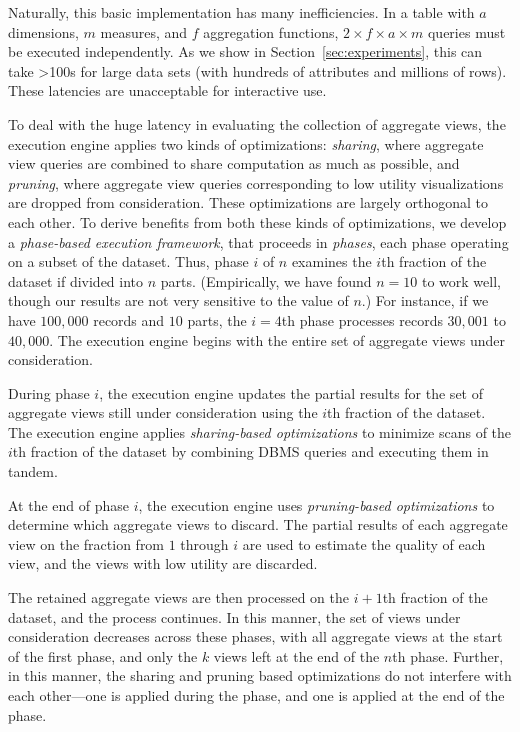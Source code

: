 Naturally, this basic implementation has many inefficiencies.
In a table with $a$ dimensions, $m$ measures, and $f$ aggregation functions, 
$2\times f \times a \times  m$ queries must be executed independently.  
As we show in Section~\ref{sec:experiments}, this can take >100s for
large data sets (with hundreds of attributes and millions of rows).
These latencies are unacceptable for interactive use.

To deal with the huge latency in 
evaluating the collection of aggregate views, 
the execution engine  
applies two kinds of optimizations:
{\em sharing}, where aggregate view queries are combined to share computation
as much as possible, and {\em pruning}, where aggregate view queries
corresponding to low utility visualizations are dropped from consideration.
These optimizations are largely orthogonal to each other.
To derive benefits from both these kinds of optimizations,
we develop a {\em phase-based execution framework}, 
that proceeds in {\em phases},
each phase operating on a subset of the dataset.
Thus, phase $i$ of $n$ examines the $i$th fraction of the dataset
if divided into $n$ parts. (Empirically, we have found $n=10$ to
work well, though our results are not very sensitive to the value
of $n$.) 
For instance, if we have $100,000$ records and $10$ parts,
the $i = 4$th phase processes records $30,001$ to $40,000$.
The execution engine begins 
with the entire set of aggregate views under consideration.
\begin{denselist}
\item During phase $i$, the execution engine updates the partial results
for the set of aggregate views
still under consideration using the $i$th fraction of the dataset.
The execution engine applies {\em sharing-based optimizations}
to minimize scans of the $i$th fraction of the dataset by combining
DBMS queries and executing them in tandem.
\item At the end of phase $i$, the execution engine uses 
{\em pruning-based optimizations} to determine which aggregate views to discard.
The partial results of each aggregate view on the fraction from $1$ through $i$ are used to 
estimate the quality of each view, and the views with low utility are discarded. 
\end{denselist}
The retained aggregate views are then processed on the $i+1$th fraction of the dataset,
and the process continues. 
In this manner, the set of views under consideration
decreases across these phases, with all aggregate views at the start 
of the first phase, and only the $k$ views left
at the end of the $n$th phase.
Further, in this manner, the sharing and pruning based optimizations do
not interfere with each other---one is applied during the phase,
and one is applied at the end of the phase.

